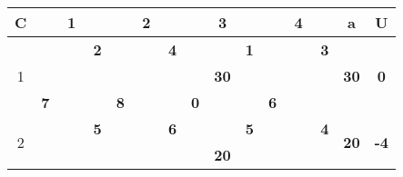 \documentclass[a4paper, 12pt]{article}
\begin{document}
\begin{table}[H]
  \centering
    \begin{tabular}{|c|cccc|cccc|cccc|cccc|rr|}
    \hline
    C     & \multicolumn{4}{c|}{1}        & \multicolumn{4}{c|}{2}        & \multicolumn{4}{c|}{3}        & \multicolumn{4}{c|}{4}        & \multicolumn{1}{c|}{a} & \multicolumn{1}{c|}{U} \bigstrut\\
    \hline
    \multirow{4}[6]{*}{1} &       &       & \multicolumn{1}{r|}{} & \textbf{2} &       &       & \multicolumn{1}{r|}{} & \textbf{4} &       &       & \multicolumn{1}{r|}{} & \cellcolor[rgb]{ 1,  .753,  0}\textbf{1} &       &       & \multicolumn{1}{r|}{} & \textbf{3} & \multicolumn{1}{c|}{\multirow{4}[6]{*}{\textbf{30}}} & \multicolumn{1}{c|}{\multirow{4}[6]{*}{\textbf{0}}} \bigstrut\\
\cline{5-5}\cline{9-9}\cline{13-13}\cline{17-17}          &       & \multicolumn{2}{c}{\multirow{2}[2]{*}{}} &       &       & \multicolumn{2}{c}{\multirow{2}[2]{*}{}} &       &       & \multicolumn{2}{c}{\multirow{2}[2]{*}{\textbf{30}}} &       &       & \multicolumn{2}{c}{\multirow{2}[2]{*}{}} &       & \multicolumn{1}{c|}{} &  \bigstrut[t]\\
          &       & \multicolumn{2}{c}{} &       &       & \multicolumn{2}{c}{} &       &       & \multicolumn{2}{c}{} &       &       & \multicolumn{2}{c}{} &       & \multicolumn{1}{c|}{} &  \bigstrut[b]\\
\cline{2-2}\cline{6-6}\cline{10-10}\cline{14-14}          & \multicolumn{1}{c|}{\textbf{7}} & \multicolumn{2}{c}{} &       & \multicolumn{1}{c|}{\textbf{8}} & \multicolumn{2}{c}{} &       & \multicolumn{1}{c|}{\textbf{0}} & \multicolumn{2}{c}{} &       & \multicolumn{1}{c|}{\textbf{6}} & \multicolumn{2}{c}{} &       & \multicolumn{1}{c|}{} &  \bigstrut\\
    \hline
    \multirow{4}[6]{*}{2} &       &       & \multicolumn{1}{r|}{} & \textbf{5} &       &       & \multicolumn{1}{r|}{} & \textbf{6} &       &       & \multicolumn{1}{r|}{} & \cellcolor[rgb]{ 1,  .753,  0}\textbf{5} &       &       & \multicolumn{1}{r|}{} & \textbf{4} & \multicolumn{1}{c|}{\multirow{4}[6]{*}{\textbf{20}}} & \multicolumn{1}{c|}{\multirow{4}[6]{*}{\textbf{-4}}} \bigstrut\\
\cline{5-5}\cline{9-9}\cline{13-13}\cline{17-17}          &       & \multicolumn{2}{c}{\multirow{2}[2]{*}{}} &       &       & \multicolumn{2}{c}{\multirow{2}[2]{*}{}} &       &       & \multicolumn{2}{c}{\multirow{2}[2]{*}{\textbf{20}}} & \multirow{3}[4]{*}{} &       & \multicolumn{2}{c}{\multirow{2}[2]{*}{}} &       & \multicolumn{1}{c|}{} &  \bigstrut[t]\\

\end{tabular}
\end{table}
\end{document}
